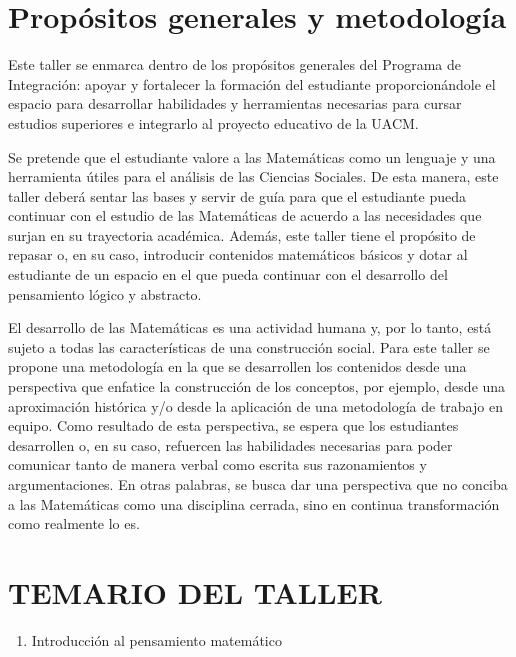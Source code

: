 \documentclass[]{book}
\providecommand{\tightlist}{%
  \setlength{\itemsep}{0pt}\setlength{\parskip}{0pt}}
\begin{document}
\section{Propósitos generales y
metodología}\label{propuxf3sitos-generales-y-metodologuxeda}

Este taller se enmarca dentro de los propósitos generales del Programa
de Integración: apoyar y fortalecer la formación del estudiante
proporcionándole el espacio para desarrollar habilidades y herramientas
necesarias para cursar estudios superiores e integrarlo al proyecto
educativo de la UACM.

Se pretende que el estudiante valore a las Matemáticas como un lenguaje
y una herramienta útiles para el análisis de las Ciencias Sociales. De
esta manera, este taller deberá sentar las bases y servir de guía para
que el estudiante pueda continuar con el estudio de las Matemáticas de
acuerdo a las necesidades que surjan en su trayectoria académica.
Además, este taller tiene el propósito de repasar o, en su caso,
introducir contenidos matemáticos básicos y dotar al estudiante de un
espacio en el que pueda continuar con el desarrollo del pensamiento
lógico y abstracto.

El desarrollo de las Matemáticas es una actividad humana y, por lo
tanto, está sujeto a todas las características de una construcción
social. Para este taller se propone una metodología en la que se
desarrollen los contenidos desde una perspectiva que enfatice la
construcción de los conceptos, por ejemplo, desde una aproximación
histórica y/o desde la aplicación de una metodología de trabajo en
equipo. Como resultado de esta perspectiva, se espera que los
estudiantes desarrollen o, en su caso, refuercen las habilidades
necesarias para poder comunicar tanto de manera verbal como escrita sus
razonamientos y argumentaciones. En otras palabras, se busca dar una
perspectiva que no conciba a las Matemáticas como una disciplina
cerrada, sino en continua transformación como realmente lo es.

\section{TEMARIO DEL TALLER}\label{temario-del-taller}

\begin{enumerate}
\def\labelenumi{\arabic{enumi}.}
\tightlist
\item
  Introducción al pensamiento matemático
\end{enumerate}
\end{document}
